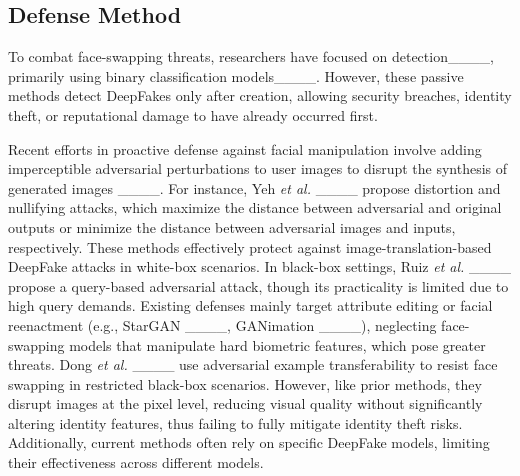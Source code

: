 \subsection{Defense Method}
To combat face-swapping threats, researchers have focused on detection____, primarily using binary classification models____.  
However, these passive methods detect DeepFakes only after creation, allowing security breaches, identity theft, or reputational damage to have already occurred first.

Recent efforts in proactive defense against facial manipulation involve adding imperceptible adversarial perturbations to user images to disrupt the synthesis of generated images ____. For instance, Yeh \textit{et al.} ____ propose distortion and nullifying attacks, which maximize the distance between adversarial and original outputs or minimize the distance between adversarial images and inputs, respectively. These methods effectively protect against image-translation-based DeepFake attacks in white-box scenarios. In black-box settings, Ruiz \textit{et al.} ____ propose a query-based adversarial attack, though its practicality is limited due to high query demands.
Existing defenses mainly target attribute editing or facial reenactment (e.g., StarGAN ____, GANimation ____), neglecting face-swapping models that manipulate hard biometric features, which pose greater threats. Dong \textit{et al.} ____ use adversarial example transferability to resist face swapping in restricted black-box scenarios. However, like prior methods, they disrupt images at the pixel level, reducing visual quality without significantly altering identity features, thus failing to fully mitigate identity theft risks. Additionally, current methods often rely on specific DeepFake models, limiting their effectiveness across different models.

